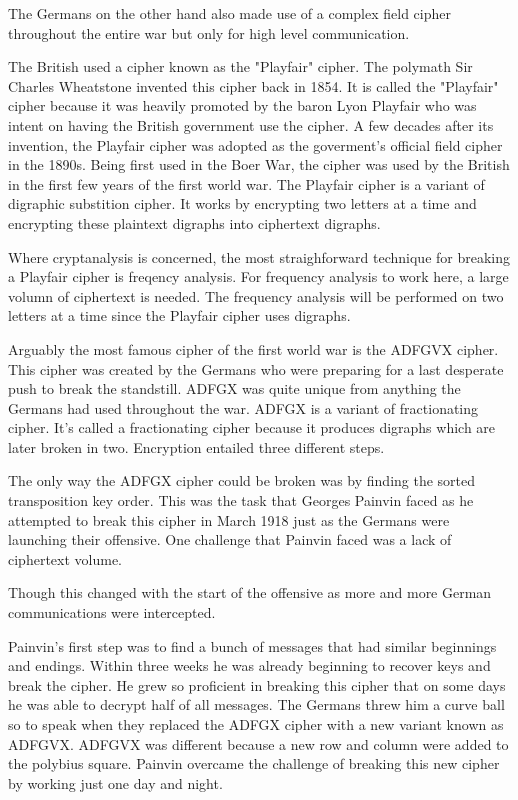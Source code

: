 \documentclass{article}
\begin{document}
    The Germans on the other hand also made use of a complex field cipher throughout
    the entire war but only for high level communication.

    The British used a cipher known as the "Playfair" cipher. The polymath
    Sir Charles Wheatstone invented this cipher back in 1854.
    It is called the "Playfair" cipher because it was heavily promoted
    by the baron Lyon Playfair who was intent on having the British government
    use the cipher. A few decades after its invention, the Playfair cipher was adopted
    as the goverment's official field cipher in the 1890s.
    Being first used in the Boer War, the cipher was used by the British in
    the first few years of the first world war.
    The Playfair cipher is a variant of digraphic substition cipher.
    It works by encrypting two letters at a time and encrypting these
    plaintext digraphs into ciphertext digraphs.

    Where cryptanalysis is concerned, the most straighforward technique for
    breaking a Playfair cipher is freqency analysis.
    For frequency analysis to work here, a large volumn of ciphertext is needed.
    The frequency analysis will be performed on two letters at a time since
    the Playfair cipher uses digraphs.

    Arguably the most famous cipher of the first world war is the
    ADFGVX cipher. This cipher was created by the Germans who were
    preparing for a last desperate push to break the standstill.
    ADFGX was quite unique from anything the Germans had used
    throughout the war. ADFGX is a variant of fractionating cipher.
    It's called a fractionating cipher because it produces
    digraphs which are later broken in two.
    Encryption entailed three different steps.

    The only way the ADFGX cipher could be broken was by finding
    the sorted transposition key order.
    This was the task that Georges Painvin faced as he attempted
    to break this cipher in March 1918 just as the Germans were
    launching their offensive.
    One challenge that Painvin faced was a lack of ciphertext volume.

    Though this changed with the start of the offensive as
    more and more German communications were intercepted.

    Painvin's first step was to find a bunch of messages that had
    similar beginnings and endings.
    Within three weeks he was already beginning to recover keys
    and break the cipher. He grew so proficient in breaking
    this cipher that on some days he was able to decrypt
    half of all messages.
    The Germans threw him a curve ball so to speak when they
    replaced the ADFGX cipher with a new variant known as ADFGVX.
    ADFGVX was different because a new row and column were added
    to the polybius square.
    Painvin overcame the challenge of breaking this new cipher
    by working just one day and night.
\end{document}
